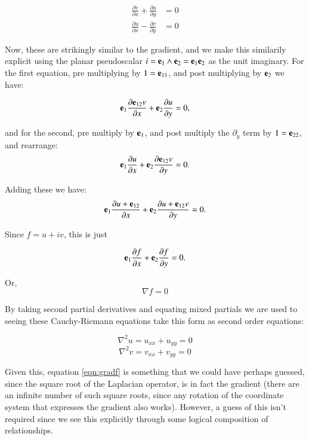 \documentclass{article}
\newcommand{\grad}[0]{\nabla}
\begin{document}
\begin{align}
\frac{\partial v}{\partial x} + \frac{\partial u}{\partial y} &= 0 \\
\frac{\partial u}{\partial x} - \frac{\partial v}{\partial y} &= 0
\end{align}

Now, these are strikingly similar to the gradient, and we make this similarily explicit using the planar
pseudoscalar
$i=\mathbf{e}_1 \wedge \mathbf{e}_2 = \mathbf{e}_1 \mathbf{e}_2$
as the unit imaginary.  For the first equation, pre multiplying by $1 = \mathbf{e}_{11}$, and post multiplying by $\mathbf{e}_2$ we have:

\begin{equation*}
\mathbf{e}_1 \frac{\partial \mathbf{e}_{12} v}{\partial x} + \mathbf{e}_{2}\frac{\partial u}{\partial y} = 0,
\end{equation*}

and for the second, pre multiply by $\mathbf{e}_1$, and post multiply the $\partial_y$ term by $1 = \mathbf{e}_{22}$, and rearrange:
\begin{equation*}
\mathbf{e}_1 \frac{\partial u}{\partial x} + \mathbf{e}_{2} \frac{\partial \mathbf{e}_{12} v}{\partial y} = 0.
\end{equation*}

Adding these we have:
\begin{equation*}
\mathbf{e}_1 \frac{\partial u + \mathbf{e}_{12}}{\partial x} + \mathbf{e}_{2} \frac{\partial u + \mathbf{e}_{12} v}{\partial y} = 0.
\end{equation*}

Since $f = u + i v$, this is just

\begin{equation}
\mathbf{e}_1 \frac{\partial f}{\partial x} + \mathbf{e}_{2} \frac{\partial f}{\partial y} = 0.
\end{equation}

Or,
\begin{equation}\label{eqn:gradf}
\grad f = 0
\end{equation}

By taking second partial derivatives and equating mixed partials we are used to seeing these Cauchy-Riemann equations
take this form as second order equations:

\begin{equation}\label{eqn:uxx}
\grad^2 u = u_{xx} + u_{yy} = 0
\end{equation}
\begin{equation}
\grad^2 v = v_{xx} + v_{yy} = 0
\end{equation}

Given this, equation \ref{eqn:gradf} is something that we could have perhaps guessed, since the square root of the Laplacian operator, is in fact the gradient (there are an infinite number of such square roots, since any rotation of the coordinate system that expresses the gradient also works).  However, a guess of this isn't required since we see this explicitly through some logical composition of relationships.
\end{document}
